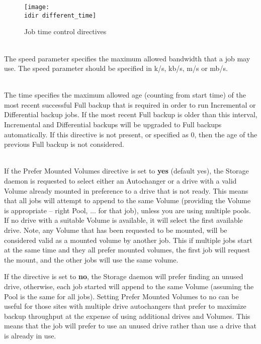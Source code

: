 \begin{description}
\begin{figure}[htbp]
  \centering
  \texttt{[image: \\idir different\_time]}
  \caption{Job time control directives}
  \label{fig:differenttime}
\end{figure}

\item [Maximum Bandwidth = {\textless}speed{\textgreater}] \hfill \\
The speed parameter specifies the maximum allowed bandwidth that a job may
use. The speed parameter should be specified in k/s, kb/s, m/s or mb/s.

\item [Max Full Interval = {\textless}time{\textgreater}] \hfill \\
The time specifies the maximum allowed age (counting from start time) of
the most recent successful Full backup that is required in order to run
Incremental or Differential backup jobs. If the most recent Full backup
is older than this interval, Incremental and Differential backups will be
upgraded to Full backups automatically. If this directive is not present,
or specified as 0, then the age of the previous Full backup is not
considered.

\label{PreferMountedVolumes}
\item [Prefer Mounted Volumes = {\textless}yes{\textbar}no{\textgreater}] \hfill \\
If the Prefer Mounted Volumes directive is set to {\bf yes} (default
yes), the Storage daemon is requested to select either an Autochanger or
a drive with a valid Volume already mounted in preference to a drive
that is not ready.  This means that all jobs will attempt to append
to the same Volume (providing the Volume is appropriate -- right Pool,
... for that job), unless you are using multiple pools.
If no drive with a suitable Volume is available, it
will select the first available drive.  Note, any Volume that has
been requested to be mounted, will be considered valid as a mounted
volume by another job.  This if multiple jobs start at the same time
and they all prefer mounted volumes, the first job will request the
mount, and the other jobs will use the same volume.

If the directive is set to {\bf no}, the Storage daemon will prefer
finding an unused drive, otherwise, each job started will append to the
same Volume (assuming the Pool is the same for all jobs).  Setting
Prefer Mounted Volumes to no can be useful for those sites
with multiple drive autochangers that prefer to maximize backup
throughput at the expense of using additional drives and Volumes.
This means that the job will prefer to use an unused drive rather
than use a drive that is already in use.


\end{description}
